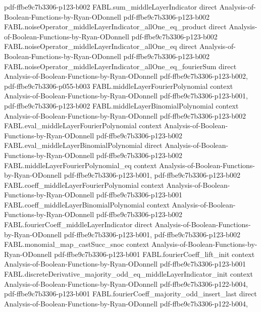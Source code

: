\begin{theorem}
  {pdf-ffbe9c7b3306-p123-b002}
\proofstep
  {FABL.sum_middleLayerIndicator}
  {direct}
  {Analysis-of-Boolean-Functions-by-Ryan-ODonnell}
  {pdf-ffbe9c7b3306-p123-b002}
\proofstep
  {FABL.noiseOperator_middleLayerIndicator_allOne_eq_product}
  {direct}
  {Analysis-of-Boolean-Functions-by-Ryan-ODonnell}
  {pdf-ffbe9c7b3306-p123-b002}
\proofstep
  {FABL.noiseOperator_middleLayerIndicator_allOne_eq}
  {direct}
  {Analysis-of-Boolean-Functions-by-Ryan-ODonnell}
  {pdf-ffbe9c7b3306-p123-b002}
\proofstep
  {FABL.noiseOperator_middleLayerIndicator_allOne_eq_fourierSum}
  {direct}
  {Analysis-of-Boolean-Functions-by-Ryan-ODonnell}
  {pdf-ffbe9c7b3306-p123-b002,
    pdf-ffbe9c7b3306-p055-b003}
\proofstep
  {FABL.middleLayerFourierPolynomial}
  {context}
  {Analysis-of-Boolean-Functions-by-Ryan-ODonnell}
  {pdf-ffbe9c7b3306-p123-b001,
    pdf-ffbe9c7b3306-p123-b002}
\proofstep
  {FABL.middleLayerBinomialPolynomial}
  {context}
  {Analysis-of-Boolean-Functions-by-Ryan-ODonnell}
  {pdf-ffbe9c7b3306-p123-b002}
\proofstep
  {FABL.eval_middleLayerFourierPolynomial}
  {context}
  {Analysis-of-Boolean-Functions-by-Ryan-ODonnell}
  {pdf-ffbe9c7b3306-p123-b002}
\proofstep
  {FABL.eval_middleLayerBinomialPolynomial}
  {direct}
  {Analysis-of-Boolean-Functions-by-Ryan-ODonnell}
  {pdf-ffbe9c7b3306-p123-b002}
\proofstep
  {FABL.middleLayerFourierPolynomial_eq}
  {context}
  {Analysis-of-Boolean-Functions-by-Ryan-ODonnell}
  {pdf-ffbe9c7b3306-p123-b001,
    pdf-ffbe9c7b3306-p123-b002}
\proofstep
  {FABL.coeff_middleLayerFourierPolynomial}
  {context}
  {Analysis-of-Boolean-Functions-by-Ryan-ODonnell}
  {pdf-ffbe9c7b3306-p123-b001}
\proofstep
  {FABL.coeff_middleLayerBinomialPolynomial}
  {context}
  {Analysis-of-Boolean-Functions-by-Ryan-ODonnell}
  {pdf-ffbe9c7b3306-p123-b002}
\proofstep
  {FABL.fourierCoeff_middleLayerIndicator}
  {direct}
  {Analysis-of-Boolean-Functions-by-Ryan-ODonnell}
  {pdf-ffbe9c7b3306-p123-b001,
    pdf-ffbe9c7b3306-p123-b002}
\proofstep
  {FABL.monomial_map_castSucc_snoc}
  {context}
  {Analysis-of-Boolean-Functions-by-Ryan-ODonnell}
  {pdf-ffbe9c7b3306-p123-b001}
\proofstep
  {FABL.fourierCoeff_lift_init}
  {context}
  {Analysis-of-Boolean-Functions-by-Ryan-ODonnell}
  {pdf-ffbe9c7b3306-p123-b001}
\proofstep
  {FABL.discreteDerivative_majority_odd_eq_middleLayerIndicator_init}
  {context}
  {Analysis-of-Boolean-Functions-by-Ryan-ODonnell}
  {pdf-ffbe9c7b3306-p122-b004,
    pdf-ffbe9c7b3306-p123-b001}
\proofstep
  {FABL.fourierCoeff_majority_odd_insert_last}
  {direct}
  {Analysis-of-Boolean-Functions-by-Ryan-ODonnell}
  {pdf-ffbe9c7b3306-p122-b004,
}
\end{theorem}
